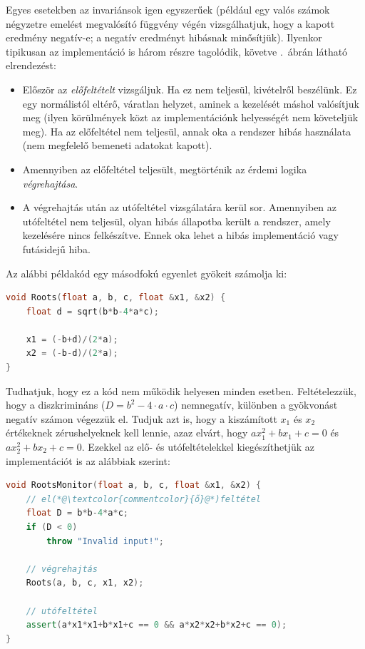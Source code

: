Egyes esetekben az invariánsok igen egyszerűek (például egy valós számok négyzetre emelést megvalósító függvény végén vizsgálhatjuk, hogy a kapott eredmény negatív-e; a negatív eredményt hibásnak minősítjük). Ilyenkor tipikusan az implementáció is három részre tagolódik, követve .~ábrán látható elrendezést:
\begin{itemize}
\item Először az \emph{előfeltételt} vizsgáljuk. Ha ez nem teljesül, kivételről beszélünk. Ez egy normálistól eltérő, váratlan helyzet, aminek a kezelését máshol valósítjuk meg (ilyen körülmények közt az implementációnk helyességét nem követeljük meg). Ha az előfeltétel nem teljesül, annak oka a rendszer hibás használata (nem megfelelő bemeneti adatokat kapott).
\item Amennyiben az előfeltétel teljesült, megtörténik az érdemi logika \emph{végrehajtása}.
\item A végrehajtás után az utófeltétel vizsgálatára kerül sor. Amennyiben az utófeltétel nem teljesül, olyan hibás állapotba került a rendszer, amely kezelésére nincs felkészítve. Ennek oka lehet a hibás implementáció vagy futásidejű hiba.
\end{itemize}

\begin{pelda}
Az alábbi példakód egy másodfokú egyenlet gyökeit számolja ki:

\begin{lstlisting}[language=C++]
void Roots(float a, b, c, float &x1, &x2) {
    float d = sqrt(b*b-4*a*c);

    x1 = (-b+d)/(2*a);
    x2 = (-b-d)/(2*a);
}
\end{lstlisting}

Tudhatjuk, hogy ez a kód nem működik helyesen minden esetben. Feltételezzük, hogy a diszkrimináns ($D=b^2-4\cdot a\cdot c$) nemnegatív, különben a gyökvonást negatív számon végezzük el. Tudjuk azt is, hogy a kiszámított $x_1$ és $x_2$ értékeknek zérushelyeknek kell lennie, azaz elvárt, hogy $ax_1^2 + bx_1 + c = 0$ és $ax_2^2 + bx_2 + c = 0$. Ezekkel az elő- és utófeltételekkel kiegészíthetjük az implementációt is az alábbiak szerint:


\begin{lstlisting}[language=C++,morekeywords={assert}]
void RootsMonitor(float a, b, c, float &x1, &x2) {
    // el(*@\textcolor{commentcolor}{ő}@*)feltétel
    float D = b*b-4*a*c;
    if (D < 0)
        throw "Invalid input!";

    // végrehajtás
    Roots(a, b, c, x1, x2);

    // utófeltétel
    assert(a*x1*x1+b*x1+c == 0 && a*x2*x2+b*x2+c == 0);
}
\end{lstlisting}
\end{pelda}

